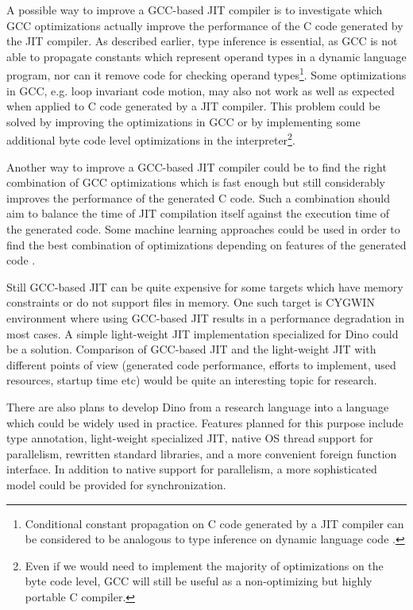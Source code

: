 \documentclass[preprint]{sigplanconf}
\begin{document}
  A possible way to improve a GCC-based JIT compiler is to investigate which
GCC optimizations actually improve the performance of the C code generated by the JIT compiler. As described earlier, type inference is essential, as GCC is not able to
propagate constants which represent operand types in a dynamic language program,
nor can it remove code for checking operand types\footnote{Conditional constant 
propagation on C code generated by a JIT compiler can be considered to be analogous to
type inference on dynamic language code \cite{Morgan} \cite{Muchnick}.}. Some 
optimizations in GCC, e.g. loop invariant code motion, may also not work as well as 
expected when applied to C code generated by a JIT compiler. This problem could be solved 
by improving the optimizations in GCC or by implementing some additional
byte code level optimizations in the interpreter\footnote{Even if we would need to 
implement the majority of optimizations on the byte code level, GCC will still be useful 
as a non-optimizing but highly portable C compiler.}.

  Another way to improve a GCC-based JIT compiler could be to find the
right combination of GCC optimizations which is fast enough but
still considerably improves the performance of the generated C code.
Such a combination should aim to balance the time of JIT compilation itself
against the execution time of the generated code.
Some machine learning approaches could be
used in order to find the best combination of optimizations
depending on features of the generated code \cite{CompilerDesign}.

  Still GCC-based JIT can be quite expensive for some targets which
have memory constraints or do not support files in memory.  One such
target is CYGWIN environment\cite{Cygwin} where using GCC-based JIT
results in a performance degradation in most cases.  A simple light-weight JIT
implementation specialized for Dino could be a solution.  Comparison
of GCC-based JIT and the light-weight JIT with different points of
view (generated code performance, efforts to implement, used
resources, startup time etc) would be quite an interesting topic for research.
  
There are also plans to develop Dino from a research language into a language which could
be widely used in practice. Features planned for this purpose include
type annotation,  light-weight specialized JIT, native OS thread support for parallelism,
rewritten standard libraries, and a more convenient foreign function 
interface. In addition to native support for parallelism,
a more sophisticated model could be provided for synchronization.
\end{document}
